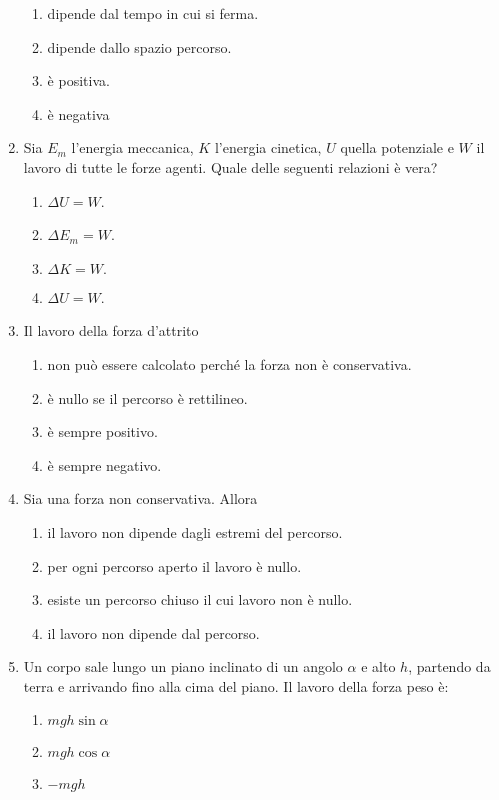 \documentclass{article}
\begin{document}
\begin{enumerate}
  \begin{enumerate}[label=\Alph*.]
    \item dipende dal tempo in cui si ferma.
    \item dipende dallo spazio percorso.
    \item è positiva.
    \item è negativa
  \end{enumerate}
  \item Sia $E_m$ l'energia meccanica, $K$ l'energia cinetica, $U$ quella potenziale e $W$ il lavoro di tutte le forze agenti. Quale delle seguenti relazioni è vera?
  \begin{enumerate}[label=\Alph*.]
    \item $\Delta U=W$.
    \item $\Delta E_m=W$.
    \item $\Delta K=W.$
    \item $\Delta U=W$.
  \end{enumerate}
  \item Il lavoro della forza d'attrito
  \begin{enumerate}[label=\Alph*.]
    \item non può essere calcolato perché la forza non è conservativa.
    \item è nullo se il percorso è rettilineo.
    \item è sempre positivo.
    \item è sempre negativo.
  \end{enumerate}
  \item Sia  una forza non conservativa. Allora
  \begin{enumerate}[label=\Alph*.]
    \item il lavoro non dipende dagli estremi del percorso.
    \item per ogni percorso aperto il lavoro è nullo.
    \item esiste un percorso chiuso il cui lavoro non è nullo.
    \item il lavoro non dipende dal percorso.
  \end{enumerate}
  \item Un corpo sale lungo un piano inclinato di un angolo $\alpha$ e alto $h$, partendo da terra e arrivando fino alla cima del piano. Il lavoro della forza peso è:
  \begin{enumerate}[label=\Alph*.]
    \item $mgh\sin\alpha$
    \item $mgh\cos\alpha$
    \item $-mgh$

\end{enumerate}
\end{enumerate}
\end{document}
